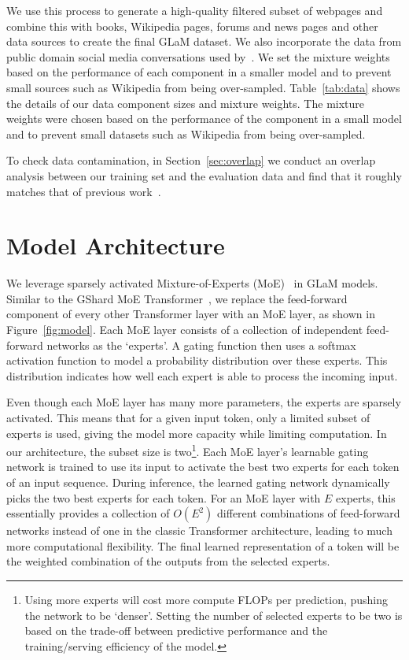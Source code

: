 We use this process to generate a high-quality filtered subset of webpages and combine this with books, Wikipedia pages, forums and news pages and other data sources to create the final GLaM dataset. We also incorporate the data from public domain social media conversations used by~\citet{meena2020}. We set the mixture weights based on the performance of each component in a smaller model and to prevent small sources such as Wikipedia from being over-sampled. Table~\ref{tab:data} shows the details of our data component sizes and mixture weights. The mixture weights were chosen based on the performance of the component in a small model and to prevent small datasets such as Wikipedia from being over-sampled.

To check data contamination, in Section~\ref{sec:overlap} we conduct an overlap analysis between our training set and the evaluation data and find that it roughly matches that of previous work~\cite{NEURIPS2020_gpt3}.
\section{Model Architecture}
\label{sec:model}
We leverage sparsely activated Mixture-of-Experts (MoE)~\cite{shazeer2017outrageously, fedus2021switch} in GLaM models. Similar to the GShard MoE Transformer~\cite{lepikhin2020gshard}, we replace the feed-forward component of every other Transformer layer with an MoE layer, as shown in Figure~\ref{fig:model}. Each MoE layer consists of a collection of independent feed-forward networks as the `experts'. A gating function then uses a softmax activation function to model a probability distribution over these experts. This distribution indicates how well each expert is able to process the incoming input. 

Even though each MoE layer has many more parameters, the experts are sparsely activated. This means that for a given input token, only a limited subset of experts is used, giving the model more capacity while limiting computation. In our architecture, the subset size is two\footnote{Using more experts will cost more compute FLOPs per prediction, pushing the network to be `denser'. Setting the number of selected experts to be two is based on the trade-off between predictive performance and the training/serving efficiency of the model.}. Each MoE layer's learnable gating network is trained to use its input to activate the best two experts for each token of an input sequence. During inference, the learned gating network dynamically picks the two best experts for each token. For an MoE layer with $E$ experts, this essentially provides a collection of $O(E^2)$ different combinations of feed-forward networks instead of one in the classic Transformer architecture, leading to much more computational flexibility.  The final learned representation of a token will be the weighted combination of the outputs from the selected experts. 

